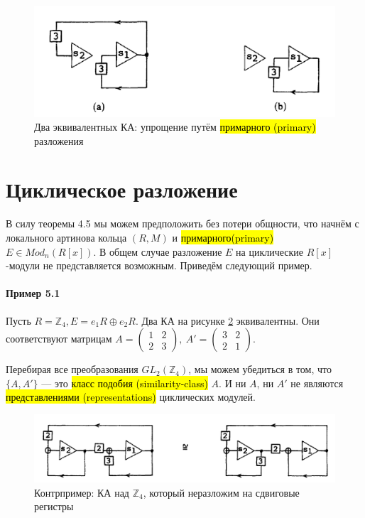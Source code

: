 \documentclass[a4paper,12pt]{article}
\begin{document}
\begin{figure}[h]
	\centering
	\includegraphics[width=0.7\linewidth]{pictures/fig3ab.png}
	\caption{Два эквивалентных КА: упрощение путём \hl{примарного (primary)} разложения}
	\label{fig3ab}
\end{figure}

\section{Циклическое разложение}
В силу теоремы 4.5 мы можем предположить без потери общности, что начнём с локального артинова кольца $(R,M)$ и \hl{примарного(primary)} $E \in Mod_n(R[x])$. В общем случае разложение $E$ на циклические $R[x]$-модули не представляется возможным. Приведём следующий пример.

\paragraph{Пример 5.1}
Пусть $R = \mathbb{Z}_4, E = e_1 R \oplus e_2 R$. Два КА на рисунке \ref{fig4} эквивалентны. Они соответствуют матрицам ${ A =
	\begin{pmatrix}
		1 & 2\\
		2 & 3
\end{pmatrix}}, ~
{ A' =
	\begin{pmatrix}
		3 & 2\\
		2 & 1
\end{pmatrix}}
$.

Перебирая все преобразования $GL_2(\mathbb{Z}_4)$, мы можем убедиться в том, что $\{A, A'\}$ --- это \hl{класс подобия (similarity-class)} $A$. И ни $A$, ни $A'$ не являются \hl{представлениями (representations)} циклических модулей. \\

\begin{figure}[h]
	\centering
	\includegraphics[width=0.7\linewidth]{pictures/fig4.png}
	\caption{Контрпример: КА над $\mathbb{Z}_4$, который неразложим на сдвиговые регистры}
	\label{fig4}
\end{figure}
\end{document}
